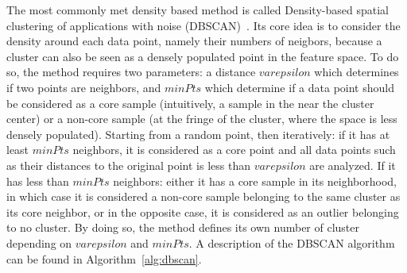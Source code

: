\documentclass[a4paper]{report}
\begin{document}
The most commonly met density based method is called Density-based spatial clustering of applications with noise (DBSCAN)~\cite{ester1996density}. Its core idea is to consider the density around each data point, namely their numbers of neigbors, because a cluster can also be seen as a densely populated point in the feature space. To do so, the method requires two parameters: a distance $varepsilon$ which determines if two points are neighbors, and $minPts$ which determine if a data point should be considered as a core sample (intuitively, a sample in the near the cluster center) or a non-core sample (at the fringe of the cluster, where the space is less densely populated). Starting from a random point, then iteratively: if it has at least $minPts$ neighbors, it is considered as a core point and all data points such as their distances to the original point is less than $varepsilon$ are analyzed. If it has less than $minPts$ neighbors: either it has a core sample in its neighborhood, in which case it is considered a non-core sample belonging to the same cluster as its core neighbor, or in the opposite case, it is considered as an outlier belonging to no cluster. By doing so, the method defines its own number of cluster depending on $varepsilon$ and $minPts$. A description of the DBSCAN algorithm can be found in Algorithm~\ref{alg:dbscan}. 
\end{document}
